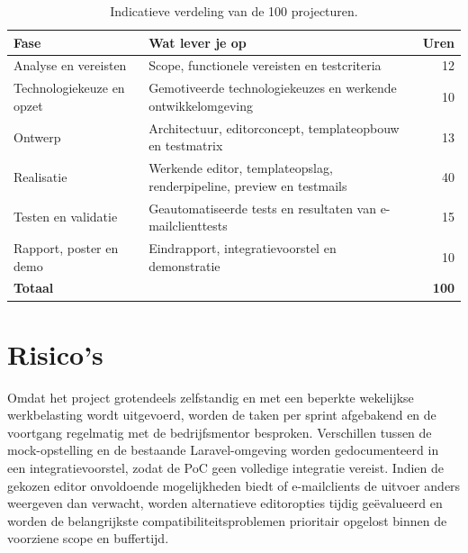 \begin{table}[htbp]
  \centering
  \begin{tabular}{p{}p{}r}
    \toprule
    \textbf{Fase} & \textbf{Wat lever je op} & \textbf{Uren} \\
    \midrule
    Analyse en vereisten
      & Scope, functionele vereisten en testcriteria
      & 12 \\
    Technologiekeuze en opzet
      & Gemotiveerde technologiekeuzes en werkende ontwikkelomgeving
      & 10 \\
    Ontwerp
      & Architectuur, editorconcept, templateopbouw en testmatrix
      & 13 \\
    Realisatie
      & Werkende editor, templateopslag, renderpipeline, preview en testmails
      & 40 \\
    Testen en validatie
      & Geautomatiseerde tests en resultaten van e-mailclienttests
      & 15 \\
    Rapport, poster en demo
      & Eindrapport, integratievoorstel en demonstratie
      & 10 \\
    \midrule
    \textbf{Totaal} & & \textbf{100} \\
    \bottomrule
  \end{tabular}
  \caption[Planning en werkbelasting]{\label{tab:vst-planning}%
    Indicatieve verdeling van de 100 projecturen.}
\end{table}


\section{Risico's}%
\label{vst:risicos}
Omdat het project grotendeels zelfstandig en met een beperkte wekelijkse
werkbelasting wordt uitgevoerd, worden de taken per sprint afgebakend en de
voortgang regelmatig met de bedrijfsmentor besproken. Verschillen tussen de
mock-opstelling en de bestaande Laravel-omgeving worden gedocumenteerd in een
integratievoorstel, zodat de PoC geen volledige integratie vereist. Indien de
gekozen editor onvoldoende mogelijkheden biedt of e-mailclients de uitvoer
anders weergeven dan verwacht, worden alternatieve editoropties tijdig
geëvalueerd en worden de belangrijkste compatibiliteitsproblemen prioritair
opgelost binnen de voorziene scope en buffertijd.

